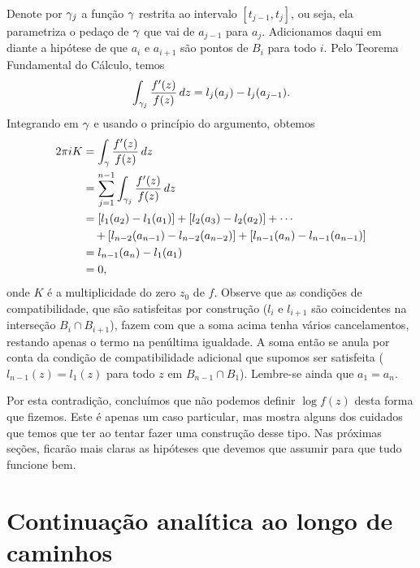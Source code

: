     Denote por $\gamma_j$ a função $\gamma$ restrita ao intervalo $[t_{j-1},t_j]$, ou seja, ela
    parametriza o pedaço de $\gamma$ que vai de $a_{j-1}$ para $a_j$. Adicionamos daqui em diante 
    a hipótese de que $a_i$ e $a_{i+1}$ são pontos de $B_i$ para todo $i$. Pelo Teorema Fundamental
    do Cálculo, temos
    \begin{equation*}
        \int_{\gamma_j} \frac{f'(z)}{f(z)}\, dz = 
        l_j(a_j) - l_j(a_{j-1}).  
    \end{equation*}
    Integrando em $\gamma$ e usando o princípio do argumento, obtemos
    \begin{align*}
        2 \pi i K &= \int_\gamma \frac{f'(z)}{f(z)}\, dz \\
                  &= \sum_{j=1}^{n-1}\int_{\gamma_j} \frac{f'(z)}{f(z)}\, dz \\
                  &= [l_1(a_2) - l_1(a_1)] + [l_2(a_3) - l_2(a_2)] + \cdots \\
                  &\quad+ [l_{n-2}(a_{n-1}) - l_{n-2}(a_{n-2})] + 
                          [l_{n-1}(a_{n}) - l_{n-1}(a_{n-1})] \\
                  &= l_{n-1}(a_n) - l_1(a_1)\\
                  &= 0,
    \end{align*}
    onde $K$ é a multiplicidade do zero $z_0$ de $f$. Observe que as condições de compatibilidade,
    que são satisfeitas por construção ($l_i$ e $l_{i+1}$ são coincidentes na interseção 
    $B_i \cap B_{i+1}$), fazem com que a soma acima tenha vários cancelamentos, restando apenas o
    termo na penúltima igualdade. A soma então se anula por conta da condição de compatibilidade
    adicional que supomos ser satisfeita ($l_{n-1}(z) = l_1(z)$ para todo $z$ em 
    $B_{n-1} \cap B_1$). Lembre-se ainda que $a_1 = a_n$.
    
    Por esta contradição, concluímos que não podemos definir $\log f(z)$ desta forma que fizemos.
    Este é apenas um caso particular, mas mostra alguns dos cuidados que temos que ter ao tentar fazer uma construção desse tipo. Nas próximas seções, ficarão mais claras as hipóteses que devemos que assumir para que tudo funcione bem.

\section{Continuação analítica ao longo de caminhos}


